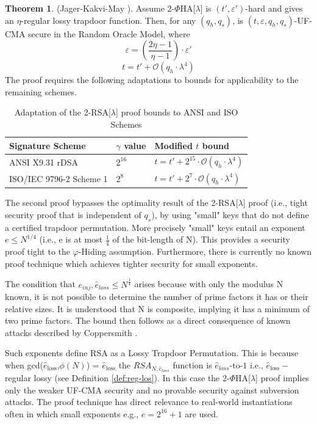 \documentclass[]{final_report}
\theoremstyle{definition}
\newtheorem{theorem}{Theorem}
\begin{document}
\begin{theorem}
(Jager-Kakvi-May \cite{jager2018security}). Assume \(2\)-\(\Phi\)HA[\(\lambda\)] is \((t', \varepsilon')\)-hard and gives an \(\eta\)-regular lossy trapdoor function. Then, for any \((q_h, q_s)\),  is \((t, \varepsilon, q_h, q_s)\)-UF-CMA secure in the Random Oracle Model, where
\[
\varepsilon = \left(\frac{2\eta - 1}{\eta - 1}\right) \cdot \varepsilon'
\]
\[
t = t' + \mathcal{O}(q_h \cdot \lambda^4)
\]
The proof requires the following adaptations to bounds for applicability to the remaining schemes.
\begin{table}[H]
\centering
\caption{Adaptation of the 2-RSA[\(\lambda\)] proof bounds to ANSI and ISO Schemes}
\begin{tabular}{|m{4.38cm}|m{1.5cm}|m{4.5cm}|}
\hline
\textbf{Signature Scheme} & \textbf{$\gamma$ value} & \textbf{Modified $t$ bound} \\ \hline
ANSI X9.31 rDSA               & \( 2^{16} \)     & \( t = t' + 2^{15} \cdot \mathcal{O}(q_h \cdot \lambda^4) \)     \\ \hline
ISO/IEC 9796-2 Scheme 1        & \( 2^{8} \)       & \( t = t' + 2^7 \cdot \mathcal{O}(q_h \cdot \lambda^4) \)       \\ \hline
\end{tabular}
\label{table:phiAdap}
\end{table}
\end{theorem}


The second proof bypasses the optimality result of the 2-RSA[\(\lambda\)] proof (i.e., tight security proof that is independent of $q_s$), by using "small" keys that do not define a certified trapdoor permutation. More precisely "small" keys entail an exponent \( e \leqslant N^{1/4} \) (i.e., e is at most $\frac{1}{4}$ of the bit-length of N). This provides a security proof tight to the $\varphi$-Hiding assumption.  Furthermore, there is currently no known proof technique which achieves tighter security for small exponents.

The condition that $e_{inj}, \hat{e}_{loss} \le N^{\frac{1}{4}}$ arises because with only the modulus N known, it is not possible to determine the number of prime factors it has or their relative sizes. It is understood that N is composite, implying it has a minimum of two prime factors. The bound then follows as a direct consequence of known attacks described by Coppersmith \cite{coppersmith1997small}.

Such exponents define RSA as a Lossy Trapdoor Permutation. This is because when gcd(\( \hat{e}_{\text{loss}} \),\( \phi(N) \)) = \( \hat{e}_{\text{loss}} \) the $RSA_{N, \hat{e}_{loss}}$ function is \( \hat{e}_{loss}{\text{-to-}}1 \) i.e., \( \hat{e}_{\text{loss}}- \) regular lossy (see Definition \ref{def:reg-los}).  In this case the \(2\)-\(\Phi\)HA[\(\lambda\)] proof implies only the weaker UF-CMA security and no provable security against subversion attacks. The proof technique has direct relevance to real-world instantiations often in which small exponents e.g., $e = 2^{16} + 1$ are used.
\end{document}
